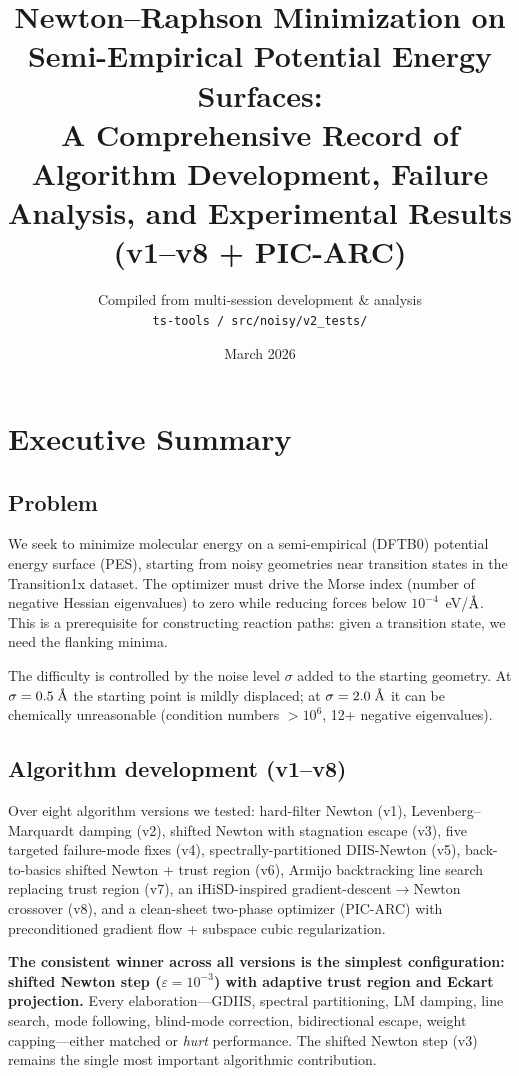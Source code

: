 \documentclass[11pt,a4paper]{article}
\title{Newton--Raphson Minimization on Semi-Empirical Potential Energy Surfaces:\\
A Comprehensive Record of Algorithm Development, Failure Analysis, and Experimental Results (v1--v8 + PIC-ARC)}
\author{Compiled from multi-session development \& analysis\\
\texttt{ts-tools / src/noisy/v2\_tests/}}
\date{March 2026}
\newcommand{\angstrom}{\text{\r{A}}}
\begin{document}
\maketitle

\section*{Executive Summary}

\subsection*{Problem}

We seek to minimize molecular energy on a semi-empirical (DFTB0) potential energy surface (PES), starting from noisy geometries near transition states in the Transition1x dataset. The optimizer must drive the Morse index (number of negative Hessian eigenvalues) to zero while reducing forces below $10^{-4}$~eV/$\angstrom$. This is a prerequisite for constructing reaction paths: given a transition state, we need the flanking minima.

The difficulty is controlled by the noise level $\sigma$ added to the starting geometry. At $\sigma = 0.5\;\angstrom$ the starting point is mildly displaced; at $\sigma = 2.0\;\angstrom$ it can be chemically unreasonable (condition numbers $> 10^6$, 12+ negative eigenvalues).

\subsection*{Algorithm development (v1--v8)}

Over eight algorithm versions we tested: hard-filter Newton (v1), Levenberg--Marquardt damping (v2), shifted Newton with stagnation escape (v3), five targeted failure-mode fixes (v4), spectrally-partitioned DIIS-Newton (v5), back-to-basics shifted Newton + trust region (v6), Armijo backtracking line search replacing trust region (v7), an iHiSD-inspired gradient-descent$\to$Newton crossover (v8), and a clean-sheet two-phase optimizer (PIC-ARC) with preconditioned gradient flow + subspace cubic regularization.

\textbf{The consistent winner across all versions is the simplest configuration: shifted Newton step ($\varepsilon = 10^{-3}$) with adaptive trust region and Eckart projection.} Every elaboration---GDIIS, spectral partitioning, LM damping, line search, mode following, blind-mode correction, bidirectional escape, weight capping---either matched or \emph{hurt} performance. The shifted Newton step (v3) remains the single most important algorithmic contribution.
\end{document}
